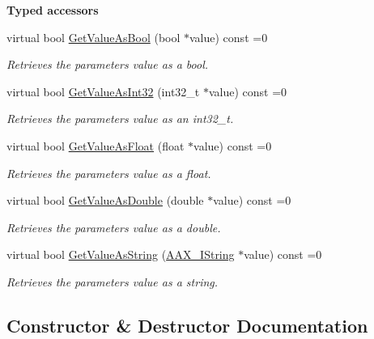 \begin{Indent}\textbf{ Typed accessors}\par
\begin{DoxyCompactItemize}
\item 
virtual bool \mbox{\hyperlink{a01853_a5d792ea5770ace586d5de9e32f35773d}{Get\+Value\+As\+Bool}} (bool $\ast$value) const =0
\begin{DoxyCompactList}\small\item\em Retrieves the parameter\textquotesingle{}s value as a bool. \end{DoxyCompactList}\item 
virtual bool \mbox{\hyperlink{a01853_a94ff37ade5306ff8832a9848007c6397}{Get\+Value\+As\+Int32}} (int32\+\_\+t $\ast$value) const =0
\begin{DoxyCompactList}\small\item\em Retrieves the parameter\textquotesingle{}s value as an int32\+\_\+t. \end{DoxyCompactList}\item 
virtual bool \mbox{\hyperlink{a01853_a4dc47beae09bee0025374e32ccae17fb}{Get\+Value\+As\+Float}} (float $\ast$value) const =0
\begin{DoxyCompactList}\small\item\em Retrieves the parameter\textquotesingle{}s value as a float. \end{DoxyCompactList}\item 
virtual bool \mbox{\hyperlink{a01853_acb2b95aa6a7f95344b320f71ceb84a9d}{Get\+Value\+As\+Double}} (double $\ast$value) const =0
\begin{DoxyCompactList}\small\item\em Retrieves the parameter\textquotesingle{}s value as a double. \end{DoxyCompactList}\item 
virtual bool \mbox{\hyperlink{a01853_ad58947974003a0296540d18849d4350c}{Get\+Value\+As\+String}} (\mbox{\hyperlink{a01873}{A\+A\+X\+\_\+\+I\+String}} $\ast$value) const =0
\begin{DoxyCompactList}\small\item\em Retrieves the parameter\textquotesingle{}s value as a string. \end{DoxyCompactList}\end{DoxyCompactItemize}
\end{Indent}


\subsection{Constructor \& Destructor Documentation}
\mbox{\label{a01853_a01435046395e84c47eef1e154b372823}} 
